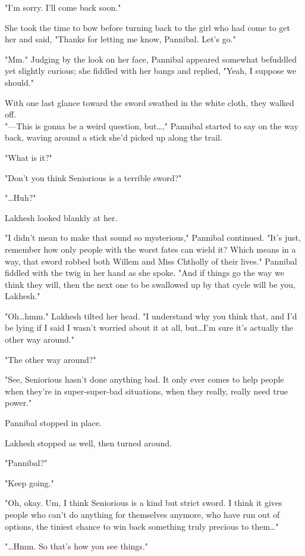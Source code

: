 "I'm sorry. I'll come back soon."

She took the time to bow before turning back to the girl who had come to get her and said, "Thanks for letting me know, Pannibal. Let's go."

"Mm." Judging by the look on her face, Pannibal appeared somewhat befuddled yet slightly curious; she fiddled with her bangs and replied, "Yeah, I suppose we should."

With one last glance toward the sword swathed in the white cloth, they walked off.
\\

"—This is gonna be a weird question, but…," Pannibal started to say on the way back, waving around a stick she'd picked up along the trail.

"What is it?"

"Don't you think Seniorious is a terrible sword?"

"…Huh?"

Lakhesh looked blankly at her.

"I didn't mean to make that sound so mysterious," Pannibal continued. "It's just, remember how only people with the worst fates can wield it? Which means in a way, that sword robbed both Willem and Miss Chtholly of their lives." Pannibal fiddled with the twig in her hand as she spoke. "And if things go the way we think they will, then the next one to be swallowed up by that cycle will be you, Lakhesh."

"Oh…hmm." Lakhesh tilted her head. "I understand why you think that, and I'd be lying if I said I wasn't worried about it at all, but…I'm sure it's actually the other way around."

"The other way around?"

"See, Seniorious hasn't done anything bad. It only ever comes to help people when they're in super-super-bad situations, when they really, really need true power."

Pannibal stopped in place.

Lakhesh stopped as well, then turned around.

"Pannibal?"

"Keep going."

"Oh, okay. Um, I think Seniorious is a kind but strict sword. I think it gives people who can't do anything for themselves anymore, who have run out of options, the tiniest chance to win back something truly precious to them…"

"…Hmm. So that's how you see things."


